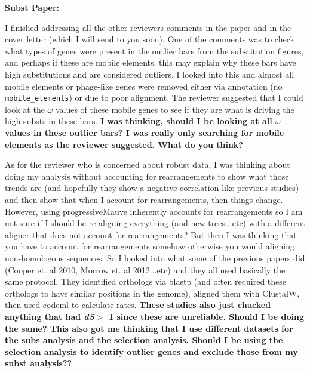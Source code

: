 \documentclass[12pt]{article}
\newcommand{\p}{progressiveMauve\xspace}
\newcommand{\ds}{\textit{dS}\xspace}
\begin{document}


\textbf{Subst Paper:}

I finished addressing all the other reviewers comments in the paper and in the cover letter (which I will send to you soon).
One of the comments was to check what types of genes were present in the outlier bars from the substitution figures, and perhaps if these are mobile elements, this may explain why these bars have high substitutions and are considered outliers.
I looked into this and almost all mobile elements or phage-like genes were removed either via annotation (no \texttt{mobile\_elements}) or due to poor alignment.
The reviewer suggested that I could look at the $\omega$ values of these mobile genes to see if they are what is driving the high substs in these bars.
\textbf{I was thinking, should I be looking at all $\omega$ values in these outlier bars? I was really only searching for mobile elements as the reviewer suggested. What do you think?}


As for the reviewer who is concerned about robust data, I was thinking about doing my analysis without accounting for rearrangements to show what those trends are (and hopefully they show a negative correlation like previous studies) and then show that when I account for rearrangements, then things change.
However, using \p inherently accounts for rearrangements so I am not sure if I should be re-aligning everything (and new trees...etc) with a different aligner that does not account for rearrangements?
But then I was thinking that you have to account for rearrangements somehow otherwise you would aligning non-homologous sequences.
So I looked into what some of the previous papers did (Cooper et. al 2010, Morrow et. al 2012...etc) and they all used basically the same protocol.
They identified orthologs via blastp (and often required these orthologs to have similar positions in the genome), aligned them with ClustalW, then used codeml to calculate rates.
\textbf{These studies also just chucked anything that had \ds $>$ 1 since these are unreliable. 
Should I be doing the same? This also got me thinking that I use different datasets for the subs analysis and the selection analysis. Should I be using the selection analysis to identify outlier genes and exclude those from my subst analysis??}
\end{document}
